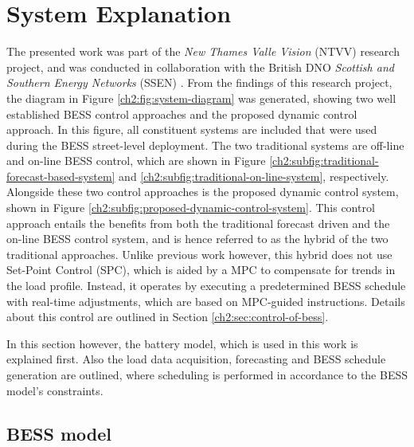 \section{System Explanation}
\label{ch2:sec:system-explanation}




The presented work was part of the \textit{New Thames Valle Vision} (NTVV) research project, and was conducted in collaboration with the British DNO \textit{Scottish and Southern Energy Networks} (SSEN) \cite{NTVV2016}.
From the findings of this research project, the diagram in Figure \ref{ch2:fig:system-diagram} was generated, showing two well established BESS control approaches and the proposed dynamic control approach.
In this figure, all constituent systems are included that were used during the BESS street-level deployment.
The two traditional systems are off-line and on-line BESS control, which are shown in Figure \ref{ch2:subfig:traditional-forecast-based-system} and \ref{ch2:subfig:traditional-on-line-system}, respectively.
Alongside these two control approaches is the proposed dynamic control system, shown in Figure \ref{ch2:subfig:proposed-dynamic-control-system}.
This control approach entails the benefits from both the traditional forecast driven and the on-line BESS control system, and is hence referred to as the hybrid of the two traditional approaches.
Unlike previous work however, this hybrid does not use Set-Point Control (SPC), which is aided by a MPC to compensate for trends in the load profile.
Instead, it operates by executing a predetermined BESS schedule with real-time adjustments, which are based on MPC-guided instructions.
Details about this control are outlined in Section \ref{ch2:sec:control-of-bess}.

In this section however, the battery model, which is used in this work is explained first.
Also the load data acquisition, forecasting and BESS schedule generation are outlined, where scheduling is performed in accordance to the BESS model's constraints.

\subsection{BESS model}

